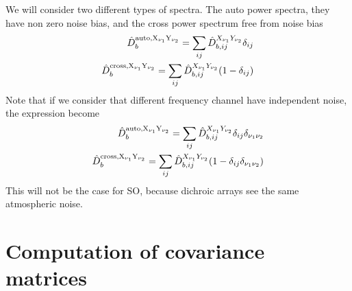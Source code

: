 \documentclass[a4paper, 11pt]{article}
\def\ba{\begin{eqnarray}}
\def\ea{\end{eqnarray}}
\begin{document}
We will consider two different types of spectra. The auto power spectra, they have non zero noise bias, and the cross power spectrum free from noise bias
\ba
\hat{D}^{\rm auto, X_{\nu_{1}}Y_{\nu_{2}}}_{b} = \sum_{ij}  \hat{D}^{X_{\nu_{1}}Y_{\nu_{2}}}_{b, ij} \delta_{ij} \\
\hat{D}^{\rm cross, X_{\nu_{1}}Y_{\nu_{2}}}_{b} = \sum_{ij}  \hat{D}^{X_{\nu_{1}}Y_{\nu_{2}}}_{b, ij} (1- \delta_{ij})
\ea
Note that if we consider that different frequency channel have independent noise, the expression become
\ba
\hat{D}^{\rm auto, X_{\nu_{1}}Y_{\nu_{2}}}_{b} = \sum_{ij}  \hat{D}^{X_{\nu_{1}}Y_{\nu_{2}}}_{b, ij} \delta_{ij} \delta_{\nu_{1} \nu_{2}}\\
\hat{D}^{\rm cross, X_{\nu_{1}}Y_{\nu_{2}}}_{b} = \sum_{ij}  \hat{D}^{X_{\nu_{1}}Y_{\nu_{2}}}_{b, ij} (1- \delta_{ij} \delta_{\nu_{1} \nu_{2}})
\ea
This will not be the case for SO, because dichroic arrays see the same atmospheric noise.


\section{Computation of covariance matrices}
\end{document}
